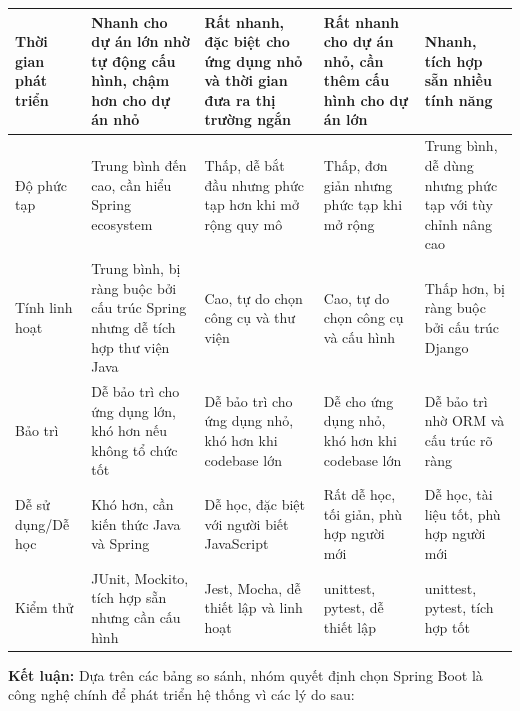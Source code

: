 \begin{enumerate}[(a)]
\begin{landscape}
\begin{longtable}{|p{3.5cm}|p{5cm}|p{5cm}|p{5cm}|p{5cm}|}
			      \hline
			      Thời gian phát triển & Nhanh cho dự án lớn nhờ tự động cấu hình, chậm hơn cho dự án nhỏ             & Rất nhanh, đặc biệt cho ứng dụng nhỏ và thời gian đưa ra thị trường ngắn & Rất nhanh cho dự án nhỏ, cần thêm cấu hình cho dự án lớn & Nhanh, tích hợp sẵn nhiều tính năng                       \\
			      \hline
			      Độ phức tạp          & Trung bình đến cao, cần hiểu Spring ecosystem                                & Thấp, dễ bắt đầu nhưng phức tạp hơn khi mở rộng quy mô                   & Thấp, đơn giản nhưng phức tạp khi mở rộng                & Trung bình, dễ dùng nhưng phức tạp với tùy chỉnh nâng cao \\
			      \hline
			      Tính linh hoạt       & Trung bình, bị ràng buộc bởi cấu trúc Spring nhưng dễ tích hợp thư viện Java & Cao, tự do chọn công cụ và thư viện                                      & Cao, tự do chọn công cụ và cấu hình                      & Thấp hơn, bị ràng buộc bởi cấu trúc Django                \\
			      \hline
			      Bảo trì              & Dễ bảo trì cho ứng dụng lớn, khó hơn nếu không tổ chức tốt                   & Dễ bảo trì cho ứng dụng nhỏ, khó hơn khi codebase lớn                    & Dễ cho ứng dụng nhỏ, khó hơn khi codebase lớn            & Dễ bảo trì nhờ ORM và cấu trúc rõ ràng                    \\
			      \hline
			      Dễ sử dụng/Dễ học    & Khó hơn, cần kiến thức Java và Spring                                        & Dễ học, đặc biệt với người biết JavaScript                               & Rất dễ học, tối giản, phù hợp người mới                  & Dễ học, tài liệu tốt, phù hợp người mới                   \\
			      \hline
			      Kiểm thử             & JUnit, Mockito, tích hợp sẵn nhưng cần cấu hình                              & Jest, Mocha, dễ thiết lập và linh hoạt                                   & unittest, pytest, dễ thiết lập                           & unittest, pytest, tích hợp tốt                            \\
			      \hline
		      \end{longtable}
	      \end{landscape}

	      \textbf{Kết luận: } Dựa trên các bảng so sánh, nhóm quyết định chọn Spring Boot là công nghệ chính để phát triển hệ thống vì các lý do sau:


\end{enumerate}
